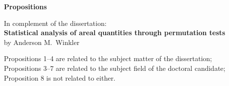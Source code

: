 \cleardoublepage
\newpage
\vspace*{\fill}
\begin{center}
\begin{Large}
\textbf{Propositions}
\end{Large}
\end{center}

\begin{center}
\begin{footnotesize}
\noindent
In complement of the dissertation:\\
\textbf{Statistical analysis of areal quantities through permutation tests}\\
by Anderson M.\ Winkler\par
\end{footnotesize}
\end{center}

\begin{center}
\begin{footnotesize}
\noindent
Propositions 1--4 are related to the subject matter of the dissertation; Propositions 3--7 are related to the subject field of the doctoral candidate; Proposition 8 is not related to either.\par
\end{footnotesize}
\end{center}

